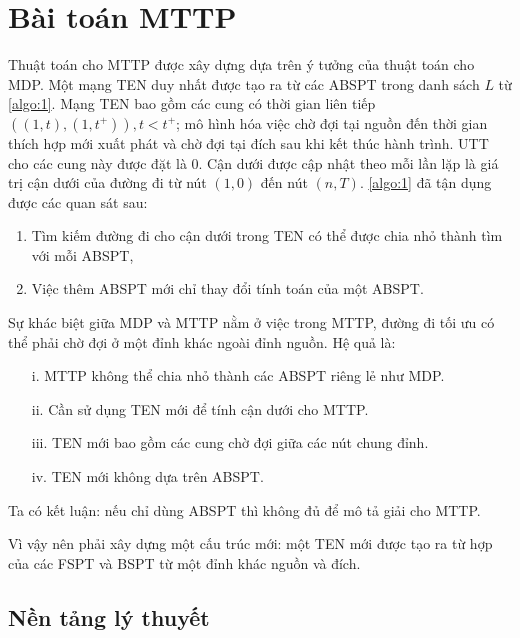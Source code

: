 \documentclass[../main.tex]{subfiles}
\begin{document}
\chapter{Bài toán MTTP}\label{giux1ea3i-buxe0i-touxe1n-mttp}

Thuật toán cho MTTP được xây dựng dựa trên ý tưởng của thuật toán cho
MDP. Một mạng TEN duy nhất được tạo ra từ các ABSPT trong danh sách
\(L\) từ \autoref{algo:1}. Mạng TEN bao gồm các cung có thời gian
liên tiếp \(((1, t), (1, t^+)), t<t^+\); mô hình hóa việc chờ đợi tại
nguồn đến thời gian thích hợp mới xuất phát và chờ đợi tại đích sau khi
kết thúc hành trình. UTT cho các cung này được đặt là 0. Cận dưới được
cập nhật theo mỗi lần lặp là giá trị cận dưới của đường đi từ nút
\((1,0)\) đến nút \((n, T)\). \autoref{algo:1} đã tận dụng được các quan sát
sau:

\begin{enumerate}
\def\labelenumi{\arabic{enumi}.}
\tightlist
\item
  Tìm kiếm đường đi cho cận dưới trong TEN có thể được chia nhỏ thành
  tìm với mỗi ABSPT,
\item
  Việc thêm ABSPT mới chỉ thay đổi tính toán của một ABSPT.
\end{enumerate}

Sự khác biệt giữa MDP và MTTP nằm ở việc trong MTTP, đường đi tối ưu có
thể phải chờ đợi ở một đỉnh khác ngoài đỉnh nguồn. Hệ quả là:

\begin{itemize}
\tightlist
\item[i.]
  MTTP không thể chia nhỏ thành các ABSPT riêng lẻ như MDP.
\item[ii.]
  Cần sử dụng TEN mới để tính cận dưới cho MTTP.
\item[iii.]
  TEN mới bao gồm các cung chờ đợi giữa các nút chung đỉnh.
\item[iv.]
  TEN mới không dựa trên ABSPT.
\end{itemize}

Ta có kết luận: nếu chỉ dùng ABSPT thì không đủ để mô tả giải cho MTTP.

Vì vậy nên phải xây dựng một cấu trúc mới: một TEN mới được tạo ra từ
hợp của các FSPT và BSPT từ một đỉnh khác nguồn và đích. 

\section{Nền tảng lý thuyết}\label{nux1ec1n-tux1ea3ng-luxfd-thuyux1ebft}
\end{document}
